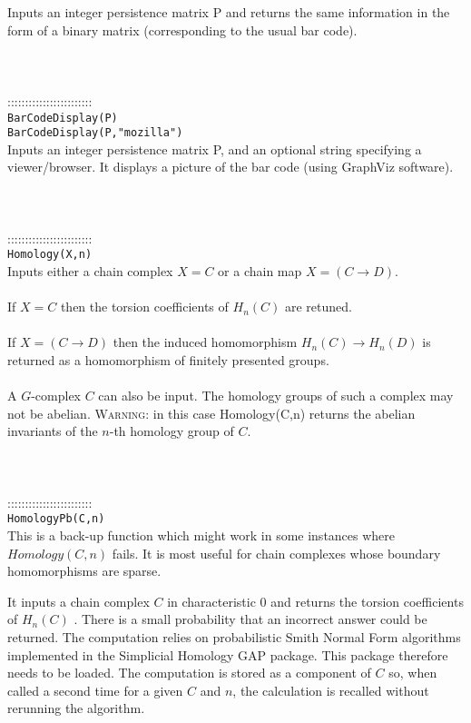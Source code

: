 \documentclass[a4paper,11pt]{report}
\begin{document}
{ Inputs an integer persistence matrix P and returns the same information in the
form of a binary matrix (corresponding to the usual bar code). \\
 \\
 \\
 \\
 ::::::::::::::::::::::::\\
 \texttt{BarCodeDisplay(P)}\\
 \texttt{BarCodeDisplay(P,"mozilla")}\\
 

 Inputs an integer persistence matrix P, and an optional string specifying a
viewer/browser. It displays a picture of the bar code (using GraphViz
software). \\
 \\
 \\
 \\
 ::::::::::::::::::::::::\\
 \texttt{Homology(X,n)}\\
 

 Inputs either a chain complex $X=C$ or a chain map $X=(C \longrightarrow D)$. \\
 \\
If $X=C$ then the torsion coefficients of $H_n(C)$ are retuned.\\
 \\
 If $X=(C \longrightarrow D)$ then the induced homomorphism $H_n(C) \longrightarrow H_n(D)$ is returned as a homomorphism of finitely presented groups. \\
 \\
 A $G$-complex $C$ can also be input. The homology groups of such a complex may not be abelian. \textsc{Warning:} in this case Homology(C,n) returns the abelian invariants of the $n$-th homology group of $C$. \\
 \\
 \\
 \\
 ::::::::::::::::::::::::\\
 \texttt{HomologyPb(C,n)}\\
 

 This is a back-up function which might work in some instances where $Homology(C,n)$ fails. It is most useful for chain complexes whose boundary homomorphisms are
sparse. 

 It inputs a chain complex $C$ in characteristic $0$ and returns the torsion coefficients of $H_n(C)$ . There is a small probability that an incorrect answer could be returned. The
computation relies on probabilistic Smith Normal Form algorithms implemented
in the Simplicial Homology GAP package. This package therefore needs to be
loaded. The computation is stored as a component of $C$ so, when called a second time for a given $C$ and $n$, the calculation is recalled without rerunning the algorithm. 

}
\end{document}

